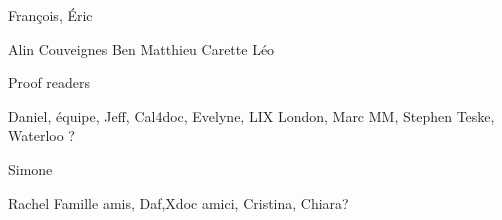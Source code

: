 François, Éric

Alin
Couveignes
Ben
Matthieu
Carette
Léo

Proof readers

Daniel, équipe, Jeff, 
Cal4doc, 
Evelyne, LIX
London, Marc MM, Stephen
Teske, Waterloo ?

Simone

Rachel
Famille
amis, Daf,Xdoc
amici, Cristina, Chiara?




